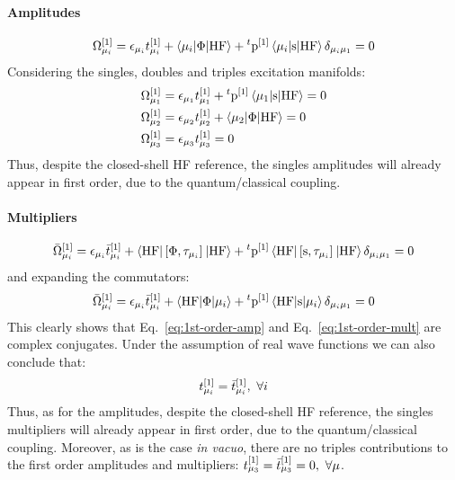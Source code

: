 \paragraph*{Amplitudes}
\begin{equation}\label{eq:1st-order-amp}
  \Omega_{\mu_i}^{[1]} = \epsilon_{\mu_i}t_{\mu_i}^{[1]}
  + \braket{\mu_i | \Phi | \mathrm{HF}}
  + {}^t\mathrm{p}^{[1]}\braket{\mu_i | \mathrm{s} | \mathrm{HF}}\delta_{\mu_i\mu_1}
  = 0
\end{equation}
Considering the singles, doubles and triples excitation manifolds:
\begin{subequations}
  \begin{align}
  \Omega_{\mu_1}^{[1]} &= \epsilon_{\mu_1}t_{\mu_1}^{[1]}
  + {}^t\mathrm{p}^{[1]}\braket{\mu_1 | \mathrm{s} | \mathrm{HF}}
  = 0 \\
  \Omega_{\mu_2}^{[1]} &= \epsilon_{\mu_2}t_{\mu_2}^{[1]}
  + \braket{\mu_2 | \Phi | \mathrm{HF}}
  = 0 \\
  \Omega_{\mu_3}^{[1]} &= \epsilon_{\mu_3}t_{\mu_3}^{[1]} = 0
  \end{align}
\end{subequations}
Thus, despite the closed-shell \acs{HF} reference, the singles
amplitudes will already appear in first order, due to the
quantum/classical coupling.

\paragraph*{Multipliers}
\begin{equation}%
  \bar{\Omega}_{\mu_i}^{[1]} =
    \denom{\mu_i}\tbar{\mu_i}^{[1]}
    + \braket{\mathrm{HF} | \commutator{\Phi}{\cluster{\mu_i}} | \mathrm{HF}}
    + {}^t\p^{[1]}\braket{\mathrm{HF} |
    \commutator{\s}{\cluster{\mu_i}} | \mathrm{HF}}\delta_{\mu_i\mu_1} =0
\end{equation}
and expanding the commutators:
\begin{equation}\label{eq:1st-order-mult}
  \bar{\Omega}_{\mu_i}^{[1]} =
    \epsilon_{\mu_i}\bar{t}_{\mu_i}^{[1]}
    + \braket{\mathrm{HF} | \Phi | \mu_i}
    + {}^t\mathrm{p}^{[1]}\braket{\mathrm{HF} | \mathrm{s} | \mu_i}\delta_{\mu_i\mu_1} =0
\end{equation}
This clearly shows that Eq.~\eqref{eq:1st-order-amp}
and Eq.~\eqref{eq:1st-order-mult} are complex conjugates. Under the
assumption of real wave functions we can also conclude that:
\begin{equation}
  t_{\mu_i}^{[1]} = \bar{t}_{\mu_i}^{[1]},\,\,\forall i
\end{equation}
Thus, as for the amplitudes, despite the closed-shell \acs{HF} reference, the singles
multipliers will already appear in first order, due to the
quantum/classical coupling.
Moreover, as is the case \emph{in vacuo}, there are no triples contributions to
the first order amplitudes and multipliers: $t_{\mu_3}^{[1]} = \bar{t}_{\mu_3}^{[1]} = 0,\,\,\forall \mu$.

